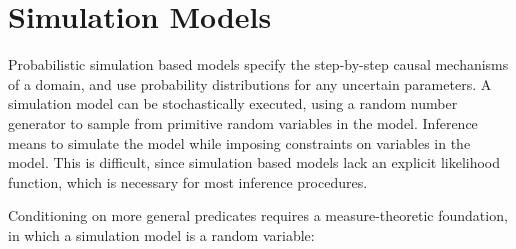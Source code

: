 
\section{Simulation Models}\label{simmodels}





Probabilistic simulation based models specify the step-by-step causal mechanisms of a domain, and use probability distributions for any uncertain parameters.
A simulation model can be stochastically executed, using a random number generator to sample from primitive random variables in the model.
Inference means to simulate the model while imposing constraints on variables in the model.
This is difficult, since simulation based models lack an explicit likelihood function, which is necessary for most inference procedures.

Conditioning on more general predicates requires a measure-theoretic foundation, in which a simulation model is a random variable:

